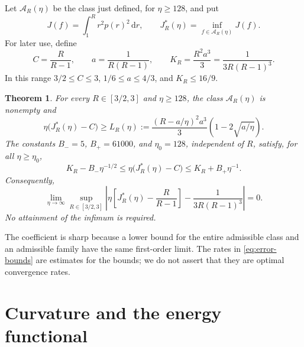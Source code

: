 \documentclass[11pt,a4paper]{article}
\newtheorem{theorem}{Theorem}
\newcommand{\dd}{\,\mathrm d}
\numberwithin{equation}{section}
\begin{document}
Let \(\mathcal A_R(\eta)\) be the class just defined, for \(\eta\ge128\), and
put
\begin{equation}\label{eq:energy-index}
 J(f)=\int_1^R r^2p(r)^2\dd r,\qquad
 J_R^*(\eta)=\inf_{f\in\mathcal A_R(\eta)}J(f).
\end{equation}
For later use, define
\begin{equation}\label{eq:constants}
 C=\frac{R}{R-1},\qquad a=\frac{1}{R(R-1)},\qquad
 K_R=\frac{R^2a^3}{3}=\frac{1}{3R(R-1)^3}.
\end{equation}
In this range \(3/2\le C\le3\), \(1/6\le a\le4/3\), and \(K_R\le16/9\).

\begin{theorem}\label{thm:main}
For every \(R\in[3/2,3]\) and \(\eta\ge128\), the class
\(\mathcal A_R(\eta)\) is nonempty and
\begin{equation}\label{eq:finite-lower}
 \eta\bigl(J_R^*(\eta)-C\bigr)\ge L_R(\eta):=
 \frac{(R-a/\eta)^2a^3}{3}
       \left(1-2\sqrt{a/\eta}\right).
\end{equation}
The constants \(B_-=5\), \(B_+=61000\), and \(\eta_0=128\), independent
of \(R\), satisfy, for all \(\eta\ge\eta_0\),
\begin{equation}\label{eq:error-bounds}
 K_R-B_-\eta^{-1/2}
 \le \eta\bigl(J_R^*(\eta)-C\bigr)
 \le K_R+B_+\eta^{-1}.
\end{equation}
Consequently,
\begin{equation}\label{eq:uniform-limit}
 \lim_{\eta\to\infty}
 \sup_{R\in[3/2,3]}
 \left|\eta\left[J_R^*(\eta)-\frac{R}{R-1}\right]
             -\frac{1}{3R(R-1)^3}\right|=0 .
\end{equation}
No attainment of the infimum is required.
\end{theorem}

The coefficient is sharp because a lower bound for the entire admissible
class and an admissible family have the same first-order limit.
The rates in \eqref{eq:error-bounds} are estimates for the bounds; we do
not assert that they are optimal convergence rates.

\section{Curvature and the energy functional}\label{sec:curvature}
\end{document}
